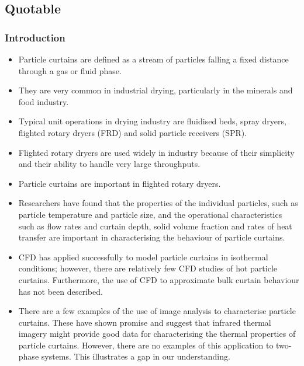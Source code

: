 \documentclass[12pt]{article}
\begin{document}
	\subsection{Quotable}
	
		\subsubsection{Introduction}
			\begin{itemize}
				\item Particle curtains are defined as a stream of particles falling a fixed distance through a gas or fluid
				phase. 
				
				\item They are very common in industrial drying, particularly in the minerals and food industry.
				\item Typical unit operations in drying
				industry are fluidised beds, spray dryers, flighted rotary dryers (FRD) and solid particle receivers
				(SPR).
				
				\item Flighted rotary dryers are used widely in industry because of their simplicity and their
				ability to handle very large throughputs.
				
				\item Particle curtains are important in flighted rotary dryers.
				
				\item Researchers have found that the properties of the individual particles, such as particle
				temperature and particle size, and the operational characteristics such as flow rates and curtain
				depth, solid volume fraction and rates of heat transfer are important in characterising the behaviour
				of particle curtains.
				
				\item CFD has applied successfully to model particle curtains in isothermal conditions; however, there are relatively few CFD studies of hot
				particle curtains. Furthermore, the use of CFD to approximate bulk curtain behaviour has not been
				described.
				
				\item There are a few examples of the use of image analysis to characterise particle curtains.
				These have shown promise and suggest that infrared thermal imagery might provide good data for
				characterising the thermal properties of particle curtains. However, there are no examples of this
				application to two-phase systems. This illustrates a gap in our understanding.
			\end{itemize}
		 
\end{document}

